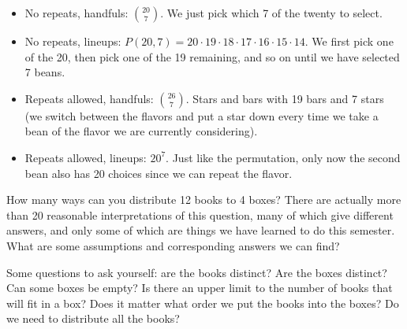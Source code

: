 \documentclass[11pt]{exam}
\begin{document}
\begin{questions}
\begin{solution}
\begin{itemize}
\item No repeats, handfuls: ${20 \choose 7}$.  We just pick which 7 of the twenty to select.
\item No repeats, lineups: $P(20,7) = 20 \cdot 19 \cdot 18 \cdot 17 \cdot 16 \cdot 15 \cdot 14$.  We first pick one of the 20, then pick one of the 19 remaining, and so on until we have selected 7 beans.
\item Repeats allowed, handfuls: ${26 \choose 7}$.  Stars and bars with 19 bars and 7 stars (we switch between the flavors and put a star down every time we take a bean of the flavor we are currently considering).
\item Repeats allowed, lineups: $20^7$.  Just like the permutation, only now the second bean also has 20 choices since we can repeat the flavor.
\end{itemize}
\end{solution}

\vfill

\question How many ways can you distribute 12 books to 4 boxes?  There are actually more than 20 reasonable interpretations of this question, many of which give different answers, and only some of which are things we have learned to do this semester.  What are some assumptions and corresponding answers we can find?

\begin{solution}
	Some questions to ask yourself: are the books distinct?  Are the boxes distinct?  Can some boxes be empty?  Is there an upper limit to the number of books that will fit in a box?  Does it matter what order we put the books into the boxes? Do we need to distribute all the books? 
	

\end{solution}
\end{questions}
\end{document}
